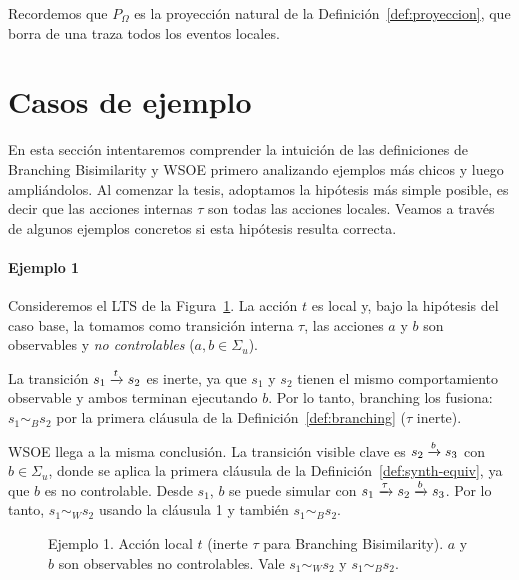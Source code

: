 Recordemos que $P_{\Omega}$ es la proyección natural de la Definición~\ref{def:proyeccion}, que borra de una traza todos los eventos locales.


\section{Casos de ejemplo}
\label{sec:ejemplos}

En esta sección intentaremos comprender la intuición de las definiciones de Branching Bisimilarity y WSOE primero analizando ejemplos más chicos y luego ampliándolos. Al comenzar la tesis, adoptamos la hipótesis más simple posible, es decir que las acciones internas $\tau$ son todas las acciones locales. Veamos a través de algunos ejemplos concretos si esta hipótesis resulta correcta.

\paragraph{Ejemplo 1}
Consideremos el LTS de la Figura~\ref{fig:cap3-ej1}. La acción $t$ es local y, bajo la hipótesis del caso base, la tomamos como transición interna $\tau$, las acciones $a$ y $b$ son observables y \textit{no controlables} ($a, b \in \Sigma_u$).

La transición $s_1 \pijl{t} s_2$ es inerte, ya que $s_1$ y $s_2$ tienen el mismo comportamiento observable y ambos terminan ejecutando $b$. Por lo tanto, branching los fusiona: $s_1 \sim_{B} s_2$ por la primera cláusula de la Definición~\ref{def:branching} ($\tau$ inerte).

WSOE llega a la misma conclusión. La transición visible clave es $s_2 \pijl{b} s_3$ con $b \in \Sigma_u$, donde se aplica la primera cláusula de la Definición~\ref{def:synth-equiv}, ya que $b$ es no controlable. Desde $s_1$, $b$ se puede simular con $s_1 \pijl{\tau} s_2 \pijl{b} s_3$. Por lo tanto, $s_1 \sim_{W} s_2$ usando la cláusula 1 y también  $s_1 \sim_{B} s_2$.

\begin{figure}[htbp]
  \centering
  \caption{Ejemplo 1. Acción local $t$ (inerte $\tau$ para Branching Bisimilarity). $a$ y $b$ son observables no controlables. Vale $s_1 \sim_{W} s_2$ y  $s_1 \sim_{B} s_2$. }
  \label{fig:cap3-ej1}
\end{figure}

